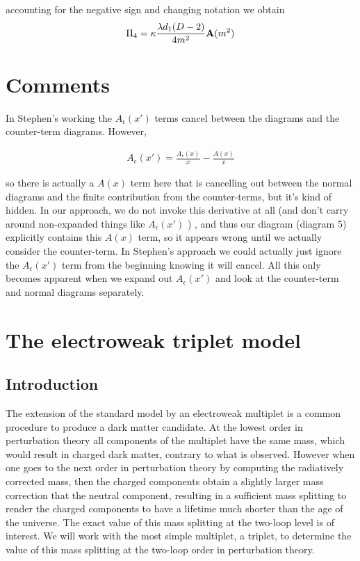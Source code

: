 \documentclass[11pt]{article}
\begin{document}
 accounting for the negative sign and changing notation we obtain
 \begin{align}
 \Pi_4 =  \kappa \frac{ \lambda d_1 (D-2)}{ 4 m^2} {\tt{\mathbf{A}}}(m^2) 
 \end{align}
 
 


 \section*{Comments}
 
 In Stephen's working the $A_{\epsilon}(x')$ terms cancel between the diagrams and the counter-term diagrams.  However,
 
 \begin{align*}
 A_{\epsilon}(x') = \frac{A_{\epsilon}(x)}{x}-\frac{A(x)}{x}
 \end{align*}
 
 so there is actually a $A(x)$ term here that is cancelling out between the normal diagrams and the finite contribution from the counter-terms, but it's kind of hidden.  In our approach, we do not invoke this derivative at all (and don't carry around non-expanded things like  $A_{\epsilon}(x')$ ) , and thus our diagram (diagram 5) explicitly contains this $A(x)$ term, so it appears wrong until we actually consider the counter-term.  In Stephen's approach we could actually just ignore the  $A_{\epsilon}(x')$  term from the beginning knowing it will cancel.  All this only becomes apparent when we expand out  $A_{\epsilon}(x')$ and look at the counter-term and normal diagrams separately.
 
 



\section{The electroweak triplet model}
\subsection{Introduction}

The extension of the standard model by an electroweak multiplet is a common procedure to produce a dark matter candidate.  At the lowest order in perturbation theory all components of the multiplet have the same mass, which would result in charged dark matter, contrary to what is observed.  However when one goes to the next order in perturbation theory by computing the radiatively corrected mass, then the charged components obtain a slightly larger mass correction that the neutral component, resulting in a sufficient mass splitting to render the charged components to have a lifetime much shorter than the age of the universe.  The exact value of this mass splitting at the two-loop level is of interest.  We will work with the most simple multiplet, a triplet, to determine the value of this mass splitting at the two-loop order in perturbation theory.
\end{document}
